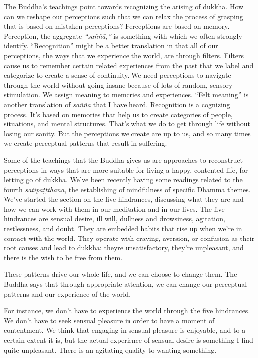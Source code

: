 The Buddha's teachings point towards recognizing the arising of dukkha. How can we reshape our perceptions such that we can relax the process of grasping that is based on mistaken perceptions? Perceptions are based on memory. Perception, the aggregate \emph{``saññā,''} is something with which we often strongly identify. ``Recognition'' might be a better translation in that all of our perceptions, the ways that we experience the world, are through filters. Filters cause us to remember certain related experiences from the past that we label and categorize to create a sense of continuity. We need perceptions to navigate through the world without going insane because of lots of random, sensory stimulation. We assign meaning to memories and experiences. ``Felt meaning'' is another translation of \emph{saññā} that I have heard. Recognition is a cognizing process. It's based on memories that help us to create categories of people, situations, and mental structures. That's what we do to get through life without losing our sanity. But the perceptions we create are up to us, and so many times we create perceptual patterns that result in suffering.

Some of the teachings that the Buddha gives us are approaches to reconstruct perceptions in ways that are more suitable for living a happy, contented life, for letting go of dukkha. We've been recently having some readings related to the fourth \emph{satipaṭṭthāna}, the establishing of mindfulness of specific Dhamma themes. We've started the section on the five hindrances, discussing what they are and how we can work with them in our meditation and in our lives. The five hindrances are sensual desire, ill will, dullness and drowsiness, agitation, restlessness, and doubt. They are embedded habits that rise up when we're in contact with the world. They operate with craving, aversion, or confusion as their root causes and lead to dukkha: they\textquotesingle re unsatisfactory, they're unpleasant, and there is the wish to be free from them.~

These patterns drive our whole life, and we can choose to change them. The Buddha says that through appropriate attention, we can change our perceptual patterns and our experience of the world.

For instance, we don't have to experience the world through the five hindrances. We don't have to seek sensual pleasure in order to have a moment of contentment. We think that engaging in sensual pleasure is enjoyable, and to a certain extent it is, but the actual experience of sensual desire is something I find quite unpleasant. There is an agitating quality to wanting something.

